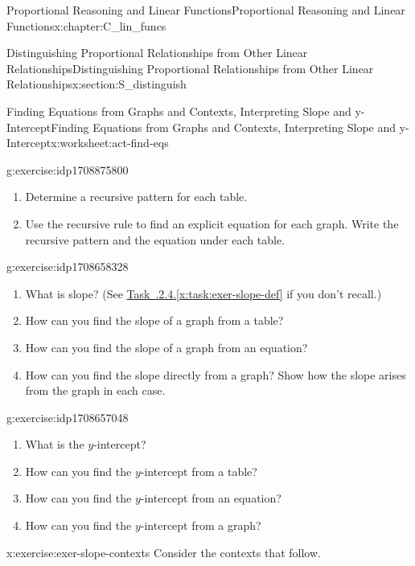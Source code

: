 \documentclass[oneside,10pt,]{book}
\newcommand{\xreffont}{\relax}
\numberwithin{equation}{chapter}
\newcommand{\hrulethin}  {\noalign{\hrule height 0.04em}}
\begin{document}
\begin{chapterptx}{Proportional Reasoning and Linear Functions}{}{Proportional Reasoning and Linear Functions}{}{}{x:chapter:C_lin_funcs}
\begin{sectionptx}{Distinguishing Proportional Relationships from Other Linear Relationships}{}{Distinguishing Proportional Relationships from Other Linear Relationships}{}{}{x:section:S_distinguish}
\begin{worksheet-subsection}{Finding Equations from Graphs and Contexts, Interpreting Slope and y-Intercept}{}{Finding Equations from Graphs and Contexts, Interpreting Slope and y-Intercept}{}{}{x:worksheet:act-find-eqs}
\begin{divisionexercise}{2}{}{}{g:exercise:idp1708875800}
\begin{enumerate}[font=\bfseries,label=(\alph*),ref=\alph*]
\begin{sidebyside}{4}{0}{0}{0}
\begin{sbspanel}{0.25}
\begin{tableptx}{\textbf{Graph D (Red)}}{x:table:tbl-line-four}{}
{{{\begin{tabular}{Acc}
&\tabularnewline\hrulethin
\end{tabular}
}%
\par}
}%
\end{tableptx}%
\end{sbspanel}%
\end{sidebyside}%
\item{}Determine a recursive pattern for each table.%
\item{}Use the recursive rule to find an explicit equation for each graph. Write the recursive pattern and the equation under each table.%
\end{enumerate}
\end{divisionexercise}%
\begin{divisionexercise}{3}{}{}{g:exercise:idp1708658328}%
\begin{enumerate}[font=\bfseries,label=(\alph*),ref=\alph*]
\item{}What is slope? (See \hyperref[x:task:exer-slope-def]{Task~{\xreffont 2.4.2.4}.{\xreffont\ref{x:task:exer-slope-def}}} if you don't recall.)%
\item{}How can you find the slope of a graph from a table?%
\item{}How can you find the slope of a graph from an equation?%
\item{}How can you find the slope directly from a graph? Show how the slope arises from the graph in each case.%
\end{enumerate}
\end{divisionexercise}%
\begin{divisionexercise}{4}{}{}{g:exercise:idp1708657048}%
\begin{enumerate}[font=\bfseries,label=(\alph*),ref=\alph*]
\item{}What is the \(y\)-intercept?%
\item{}How can you find the \(y\)-intercept from a table?%
\item{}How can you find the \(y\)-intercept from an equation?%
\item{}How can you find the \(y\)-intercept from a graph?%
\end{enumerate}
\end{divisionexercise}%
\begin{divisionexercise}{5}{}{}{x:exercise:exer-slope-contexts}%
Consider the contexts that follow.%

\end{divisionexercise}
\end{worksheet-subsection}
\end{sectionptx}
\end{chapterptx}
\end{document}
